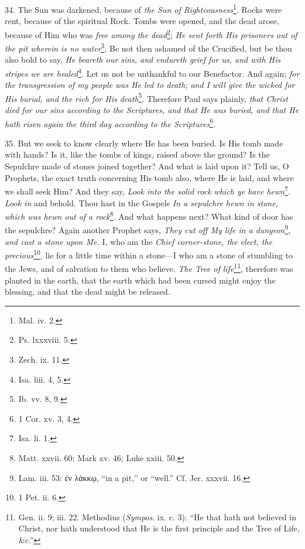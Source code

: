 34. The Sun was darkened, because of \emph{the Sun of Righteousness}\footnote{Mal. iv. 2.}. Rocks were rent, because of the spiritual Rock. Tombs were opened, and the dead arose, because of Him who was \emph{free among the dead}\footnote{Ps. lxxxviii. 5.}; \emph{He sent forth His prisoners out of the pit wherein is no water}\footnote{Zech. ix. 11.}. Be not then ashamed of the Crucified, but be thou also bold to say, \emph{He beareth our sins, and endureth grief for us, and with His stripes we are healed}\footnote{Isa. liii. 4, 5.}. Let us not be unthankful to our Benefactor. And again; \emph{for the transgression of my people was He led to death; and I will give the wicked for His burial, and the rich for His death}\footnote{Ib. vv. 8, 9.}. Therefore Paul says plainly, \emph{that Christ died for our sins according to the Scriptures, and that He was buried, and that He hath risen again the third day according to the Scriptures}\footnote{1 Cor. xv. 3, 4.}.

35. But we seek to know clearly where He has been buried. Is His tomb made with hands? Is it, like the tombs of kings, raised above the ground? Is the Sepulchre made of stones joined together? And what is laid upon it? Tell us, O Prophets, the exact truth concerning His tomb also, where He is laid, and where we shall seek Him? And they say, \emph{Look into the solid rock which ye have hewn}\footnote{Isa. li. 1.}. \emph{Look in} and behold. Thou hast in the Gospels \emph{In a sepulchre hewn in stone, which was hewn out of a rock}\footnote{Matt. xxvii. 60; Mark xv. 46; Luke xxiii. 50.}. And what happens next? What kind of door has the sepulchre? Again another Prophet says, \emph{They cut off My life in a dungeon}\footnote{Lam. iii. 53: \textgreek{ἐν λάκκῳ}, “in a pit,” or “well.” Cf. Jer. xxxvii. 16.}, \emph{and cast a stone upon Me.} I, who am the \emph{Chief corner-stone, the elect, the precious}\footnote{1 Pet. ii. 6.}, lie for a little time within a stone—I who am a stone of stumbling to the Jews, and of salvation to them who believe. \emph{The Tree of life}\footnote{Gen. ii. 9; iii. 22. Methodius (\emph{Sympos}. ix. c. 3): “He that hath not believed in Christ, nor hath understood that He is the first principle and the Tree of Life, \&c.”}, therefore was planted in the earth, that the earth which had been cursed might enjoy the blessing, and that the dead might be released.


